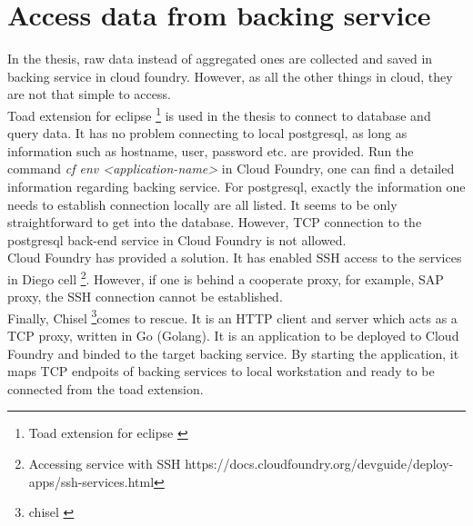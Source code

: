 \section{Access data from backing service}
In the thesis, raw data instead of aggregated ones are collected and saved in backing service in cloud foundry. However, as all the other things in cloud, they are not that simple to access. \\
Toad extension for eclipse \footnote{Toad extension for eclipse \citep{toad}} is used in the thesis to connect to database and query data. It has no problem connecting to local postgresql, as long as information such as hostname, user, password etc. are provided. Run the command \textit{cf env <application-name>} in Cloud Foundry, one can find a detailed information regarding backing service. For postgresql, exactly the information one needs to establish connection locally are all listed. It seems to be only straightforward to get into the database. However, TCP connection to the postgresql back-end service in Cloud Foundry is not allowed.\\
Cloud Foundry has provided a solution. It has enabled SSH access to the services in Diego cell \footnote{Accessing service with SSH https://docs.cloudfoundry.org/devguide/deploy-apps/ssh-services.html}. However, if one is behind a cooperate proxy, for example, SAP proxy, the SSH connection cannot be established. \\
Finally, Chisel \footnote{chisel \citep{chisel}}comes to rescue. It is an HTTP client and server which acts as a TCP proxy, written in Go (Golang). It is an application to be deployed to Cloud Foundry and binded to the target backing service. By starting the application, it maps TCP endpoits of backing services to local workstation and ready to be connected from the toad extension. 


